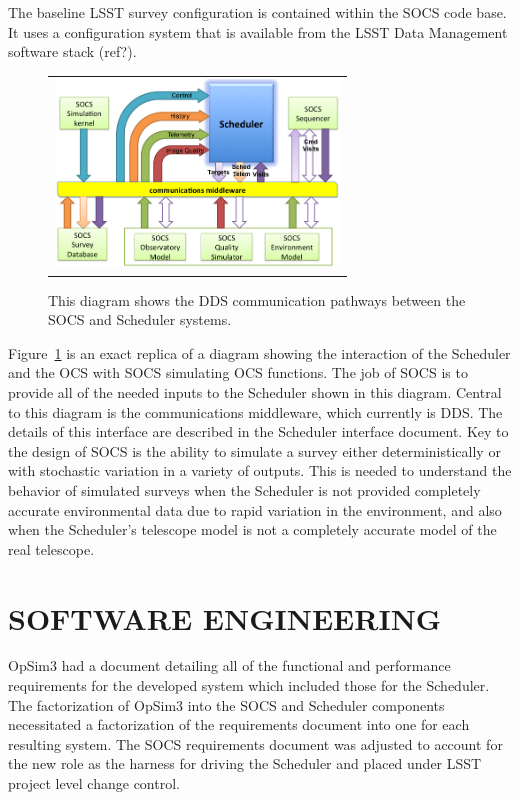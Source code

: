 \documentclass[]{spie}  %
\begin{document}
The baseline LSST survey configuration is contained within the SOCS code base. It uses a configuration system that is available from the LSST Data Management software stack (ref?). 

\begin{figure} [ht]
	\begin{center}
		\begin{tabular}{c}
			\includegraphics[height=5cm]{CommFlow.png}
		\end{tabular}
	\end{center}
	\caption[example]
	{ \label{fig:commflow} 
		This diagram shows the DDS communication pathways between the SOCS and Scheduler systems.}
\end{figure}

Figure~\ref*{fig:commflow} is an exact replica of a diagram showing the interaction of the Scheduler and the OCS with SOCS simulating OCS functions. The job of SOCS is to provide all of the needed inputs to the Scheduler shown in this diagram. Central to this diagram is the communications middleware, which currently is DDS. The details of this interface are described in the Scheduler interface document. Key to the design of SOCS is the ability to simulate a survey either deterministically or with stochastic variation in a variety of outputs. This is needed to understand the behavior of simulated surveys when the Scheduler is not provided completely accurate environmental data due to rapid variation in the environment, and also when the Scheduler’s telescope model is not a completely accurate model of the real telescope.

\section{SOFTWARE ENGINEERING}

OpSim3 had a document detailing all of the functional and performance requirements for the developed system which included those for the Scheduler. The factorization of OpSim3 into the SOCS and Scheduler components necessitated a factorization of the requirements document into one for each resulting system. The SOCS requirements document was adjusted to account for the new role as the harness for driving the Scheduler and placed under LSST project level change control.
\end{document}
